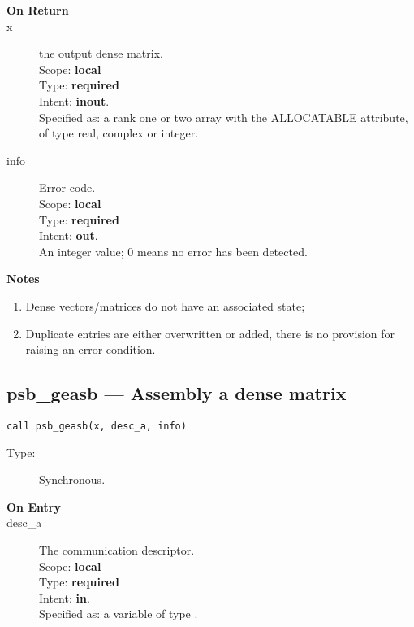 \begin{description}
\item[\bf On Return]
\item[x] the output dense matrix.\\
Scope: {\bf local} \\
Type: {\bf required}\\
Intent: {\bf inout}.\\
Specified as: a rank one or two array with the ALLOCATABLE
attribute, of type real, complex or integer.\\
\item[info] Error code.\\
Scope: {\bf local} \\
Type: {\bf required} \\
Intent: {\bf out}.\\
An integer value; 0 means no error has been detected. 
\end{description}

{\par\noindent\large\bfseries Notes}
\begin{enumerate}
\item Dense vectors/matrices do not have an associated state;
\item Duplicate entries are either overwritten or added, there is no
  provision for raising an error condition. 
\end{enumerate}


%
%
\clearpage\subsection*{psb\_geasb --- Assembly a dense matrix}

\begin{verbatim}
call psb_geasb(x, desc_a, info)
\end{verbatim}

\begin{description}
\item[Type:] Synchronous.
\item[\bf On Entry]
\item[desc\_a] The communication descriptor.\\
Scope: {\bf local} \\
Type: {\bf required}\\
Intent: {\bf in}.\\
Specified as: a variable of type \descdata.\\
\end{description}

